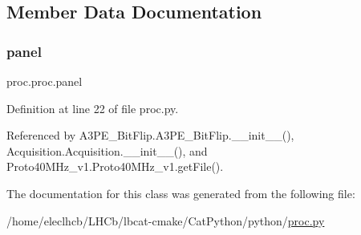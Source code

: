 \subsection{Member Data Documentation}
\mbox{\label{classproc_1_1proc_a36068ce6d978f4f4dde164e7bdc2e057}} 
\subsubsection{\texorpdfstring{panel}{panel}}
{\footnotesize\ttfamily proc.\+proc.\+panel}



Definition at line 22 of file proc.\+py.



Referenced by A3\+P\+E\+\_\+\+Bit\+Flip.\+A3\+P\+E\+\_\+\+Bit\+Flip.\+\_\+\+\_\+init\+\_\+\+\_\+(), Acquisition.\+Acquisition.\+\_\+\+\_\+init\+\_\+\+\_\+(), and Proto40\+M\+Hz\+\_\+v1.\+Proto40\+M\+Hz\+\_\+v1.\+get\+File().



The documentation for this class was generated from the following file\+:\begin{DoxyCompactItemize}
\item 
/home/eleclhcb/\+L\+H\+Cb/lbcat-\/cmake/\+Cat\+Python/python/\hyperlink{proc_8py}{proc.\+py}\end{DoxyCompactItemize}
